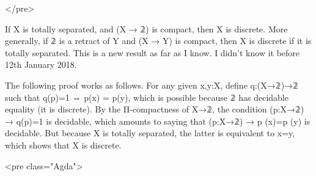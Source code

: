 </pre>

If X is totally separated, and (X → 𝟚) is compact, then X is
discrete. More generally, if 𝟚 is a retract of Y and (X → Y) is
compact, then X is discrete if it is totally separated. This is a new
result as far as I know. I didn't know it before 12th January 2018.

The following proof works as follows. For any given x,y:X, define
q:(X→𝟚)→𝟚 such that q(p)=1 ⇔ p(x) = p(y), which is possible because 𝟚
has decidable equality (it is discrete). By the Π-compactness of X→𝟚,
the condition (p:X→𝟚) → q(p)=1 is decidable, which amounts to saying
that (p:X→𝟚) → p (x)=p (y) is decidable. But because X is totally
separated, the latter is equivalent to x=y, which shows that X is
discrete.

<pre class="Agda">


